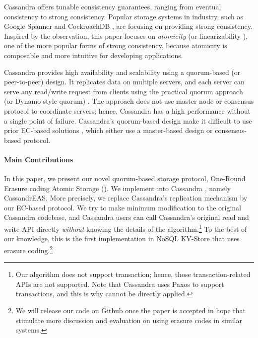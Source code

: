 Cassandra offers tunable consistency guarantees, ranging from eventual consistency to strong consistency.
Popular storage systems in industry, such as Google Spanner \cite{Spanner} and CockroachDB \cite{cockroachDB}, are focusing on providing strong consistency. 
Inspired by the observation, this paper focuses on \textit{atomicity} \cite{lamport} (or linearizability \cite{herlihy1990linearizability}), one of the more popular forms of strong consistency, because atomicity is composable \cite{herlihy1990linearizability} and more intuitive for developing applications.


Cassandra provides high availability and scalability using a quorum-based (or peer-to-peer) design.
It replicates data on multiple servers, and each server can serve any read/write request from clients 
using the practical quorum approach (or Dynamo-style quorum) \cite{pbs-vldb2012}. 
The approach does not use master node or consensus protocol to coordinate servers; hence, Cassandra has a high performance without a single point of failure. 
Cassandra's quorum-based design make it difficult to use prior EC-based solutions \cite{Cocytus2016,GIZA2017}, which either use a master-based design or consensus-based protocol.

\paragraph*{Main Contributions}

In this paper, we present our novel quorum-based storage protocol, One-Round Erasure coding Atomic Storage (\oreas). 
We implement \oreas{} into Cassandra \cite{Cassandra2010}, namely CassandrEAS.
More precisely, we replace Cassandra's replication mechanism by our EC-based protocol.
We try to make minimum modification to the original Cassandra codebase, and Cassandra users can call Cassandra's original read and write API directly \textit{without} knowing the details of the algorithm.\footnote{Our algorithm does not support transaction; hence, those transaction-related APIs are not supported. Note that Cassandra uses Paxos \cite{paxos} to support transactions, and this is why \oreas{} cannot be directly applied.} 
To the best of our knowledge, this is the first implementation in NoSQL KV-Store that uses erasure coding.\footnote{We will release our code on Github once the paper is accepted in hope that stimulate more discussion and evaluation on using erasure codes in similar systems.} 


